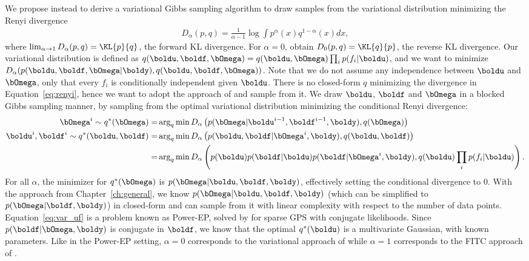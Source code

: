 We propose instead to derive a variational Gibbs sampling algorithm to draw samples from the variational distribution minimizing the Renyi divergence
\begin{align}
    D_\alpha(p,q) = \frac{1}{\alpha - 1}\log\int p^\alpha(x)q^{1-\alpha}(x)dx,\label{eq:renyi}
\end{align}
where $\lim_{\alpha\rightarrow 1} D_\alpha(p, q) = \KL{p}{q}$, the forward KL divergence.
For $\alpha=0$, obtain $D_0(p,q) = \KL{q}{p}$, the reverse KL divergence.
Our variational distribution is defined as $q(\boldu,\boldf,\bOmega) = q(\boldu,\bOmega)\prod_i p(f_i|\boldu)$, and we want to minimize $D_\alpha(p(\boldu,\boldf,\bOmega|\boldy),q(\boldu,\boldf,\bOmega))$.
Note that we do not assume any independence between $\boldu$ and $\bOmega$, only that every $f_i$ is conditionally independent given $\boldu$.
There is no closed-form $q$  minimizing the divergence in Equation~\eqref{eq:renyi}, hence we want to adopt the approach of \citet{hensmanMCMCVariationallySparse2015} and sample from it.
We draw $\boldu$, $\boldf$ and $\bOmega$ in a blocked Gibbs sampling manner, by sampling from the optimal variational distribution minimizing the conditional Renyi divergence:
\begin{align}
    \bOmega^i \sim q^*(\bOmega) =& \arg_q \min D_\alpha\left(p(\bOmega|\boldu^{i-1},\boldf^{i-1},\boldy),q(\bOmega)\right)\label{eq:var_omega}\\
    \boldu^i, \boldf^i \sim q^*(\boldu,\boldf) =& \arg_q \min D_\alpha\left(p(\boldu,\boldf|\bOmega^i,\boldy),q(\boldu,\boldf)\right)\nonumber\\
    =& \arg_q \min D_\alpha\left(p(\boldu)p(\boldf|\boldu)p(\boldf|\bOmega^i,\boldy),q(\boldu)\prod_i p(f_i|\boldu)\right).\label{eq:var_uf}
\end{align}
For all $\alpha$, the minimizer for $q^*(\bOmega)$ is $p(\bOmega|\boldu,\boldf,\boldy)$, effectively setting the conditional divergence to 0.
With the approach from Chapter~\ref{ch:general}, we know $p(\bOmega|\boldu,\boldf,\boldy)$ (which can be simplified to $p(\bOmega|\boldf,\boldy)$) in closed-form and can sample from it with linear complexity with respect to the number of data points.\\
Equation~\eqref{eq:var_uf} is a problem known as Power-EP, solved by \citet{buiUnifyingFrameworkGaussian2017} for sparse \ac{GPS} with conjugate likelihoods.
Since $p(\boldf|\bOmega,\boldy)$ is conjugate in $\boldf$, we know that the optimal $q^*(\boldu)$ is a multivariate Gaussian, with known parameters.
Like in the Power-EP setting, $\alpha=0$ corresponds to the variational approach of \citet{Titsias2009} while $\alpha=1$ corresponds to the FITC approach of \citet{snelsonSparseGaussianProcesses2009}.

